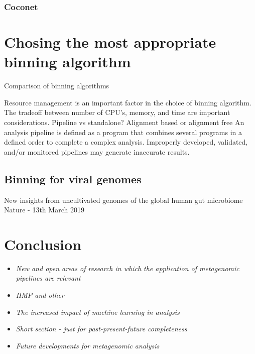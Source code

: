 \documentclass{article}
\begin{document}
\subsubsection{Coconet}

\section{Chosing the most appropriate binning algorithm}
\begin{sidewaystable}
\begin{tiny}
\centering
\caption[Comparison of binning algorithms]{Comparison of binning algorithms}
	
\label{Tbinningsoftware}
\end{tiny}
\end{sidewaystable}

Resource management is an important factor in the choice of binning algorithm.
The tradeoff between number of CPU's, memory, and time are important considerations.
Pipeline vs standalone?
Alignment based or alignment free
An analysis pipeline is defined as a program that combines several programs in a defined order to complete a complex analysis.
Improperly developed, validated, and/or monitored pipelines may generate inaccurate results. 

\subsection{Binning for viral genomes}
New insights from uncultivated genomes of the global human gut microbiome
Nature - 13th March 2019 \cite{nayfach2019new}

\section{Conclusion}
\begin{itemize}
	\item \emph{New and open areas of research in which the application of metagenomic pipelines are relevant}
	\item \emph{HMP and other }
	\item \emph{The increased impact of machine learning in analysis}
	\item \emph{Short section - just for past-present-future completeness}
	\item \emph{Future developments for metagenomic analysis}
\end{itemize}



\end{document}
